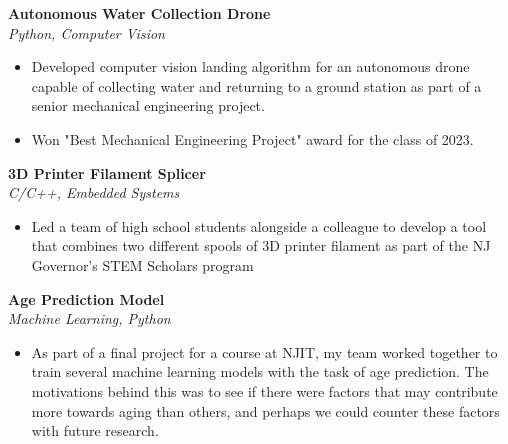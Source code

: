 \documentclass[a4paper]{article}
\begin{document}
            {\textbf{Autonomous Water Collection Drone}}\\
            \textit{Python, Computer Vision}
            \vspace{-1mm}
            \begin{itemize} \itemsep 1pt
            
                    \item Developed computer vision landing algorithm for an autonomous drone capable of collecting water and returning to a ground station as part of a senior mechanical engineering project.
                
                    \item Won "Best Mechanical Engineering Project" award for the class of 2023.
                
            \end{itemize}
            \vspace*{2mm}
            
            {\textbf{3D Printer Filament Splicer}}\\
            \textit{C/C++, Embedded Systems}
            \vspace{-1mm}
            \begin{itemize} \itemsep 1pt
            
                    \item Led a team of high school students alongside a colleague to develop a tool that combines two different spools of 3D printer filament as part of the NJ Governor’s STEM Scholars program
                
            \end{itemize}
            \vspace*{2mm}
            
            {\textbf{Age Prediction Model}}\\
            \textit{Machine Learning, Python}
            \vspace{-1mm}
            \begin{itemize} \itemsep 1pt
            
                    \item As part of a final project for a course at NJIT, my team worked together to train several machine learning models with the task of age prediction. The motivations behind this was to see if there were factors that may contribute more towards aging than others, and perhaps we could counter these factors with future research.
                
            \end{itemize}
            \vspace*{2mm}
            
\end{document}
